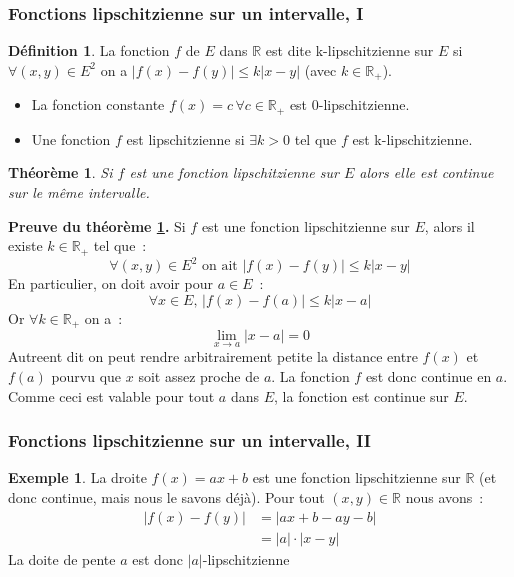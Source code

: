 \documentclass[10pt,notheorems]{beamer}
\theoremstyle{plain}
\newtheorem{theorem}{Théorème}
\theoremstyle{definition} %
\newtheorem{definition}{Définition}
\newtheorem{example}{Exemple}
\begin{document}
\begin{frame}
  \frametitle{Fonctions lipschitzienne sur un intervalle, I}

  \hypertarget{slide_fonction_lipschitzienne}{}

  \begin{definition}
    La fonction $f$ de $E$ dans $\mathbb R$ est dite k-lipschitzienne sur $E$ si $\forall (x,y)\in E^2$ on a $|f(x)-f(y)|\leq k|x-y|$ (avec $k\in\mathbb R_+$).
  \end{definition}

  \bigskip

  \begin{itemize}
  \item La fonction constante $f(x)=c\,\forall c\in\mathbb R_+$ est 0-lipschitzienne.\newline
  \item Une fonction $f$ est lipschitzienne si $\exists k>0$ tel que $f$ est k-lipschitzienne.\newline
  \end{itemize}

  \begin{theorem}\label{thm:lipschitz}
    Si $f$ est une fonction lipschitzienne sur $E$ alors elle est continue sur le même intervalle.
  \end{theorem}

\end{frame}


\begin{notes}

  \textbf{Preuve du théorème \hyperlink{slide_fonction_lipschitzienne}{\ref{thm:lipschitz}}.} Si $f$ est une fonction lipschitzienne sur $E$, alors il existe $k\in\mathbb R_+$ tel que~:
  \[
    \forall (x,y)\in E^2 \text{ on ait } |f(x)-f(y)|\leq k|x-y|
  \]
  En particulier, on doit avoir pour $a\in E$~:
  \[
    \forall x\in E,\, |f(x)-f(a)|\leq k|x-a|
  \]
  Or $\forall k\in\mathbb R_+$ on a~:
  \[
    \lim_{x\rightarrow a} |x-a| = 0
  \]
  Autreent dit on peut rendre arbitrairement petite la distance entre $f(x)$ et $f(a)$ pourvu que $x$ soit assez proche de $a$. La fonction $f$ est donc continue en $a$. Comme ceci est valable pour tout $a$ dans $E$, la fonction est continue sur $E$.

\end{notes}


\begin{frame}
  \frametitle{Fonctions lipschitzienne sur un intervalle, II}

  \begin{example}
    La droite $f(x) = ax+b$ est une fonction lipschitzienne sur
    $\mathbb R$ (et donc continue, mais nous le savons déjà). Pour
    tout $(x,y)\in\mathbb R$ nous avons~:
    \[
      \begin{split}
        |f(x)-f(y)| &= |ax+b-ay-b|\\
        &= |a|\cdot|x-y|
      \end{split}
    \]
    La doite de pente $a$ est donc $|a|$-lipschitzienne
  \end{example}

\end{frame}
\end{document}
